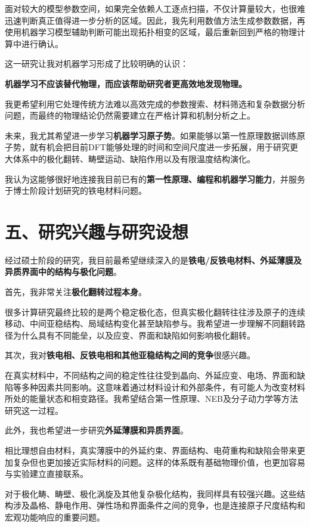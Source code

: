 面对较大的模型参数空间，如果完全依赖人工逐点扫描，不仅计算量较大，也很难迅速判断真正值得进一步分析的区域。因此，我先利用数值方法生成参数数据，再使用机器学习模型辅助判断可能出现拓扑相变的区域，最后重新回到严格的物理计算中进行确认。

这一研究让我对机器学习形成了比较明确的认识：

\textbf{机器学习不应该替代物理，而应该帮助研究者更高效地发现物理。}

我更希望利用它处理传统方法难以高效完成的参数搜索、材料筛选和复杂数据分析问题，而最终的物理结论仍然需要建立在严格计算和机制分析之上。

未来，我尤其希望进一步学习\textbf{机器学习原子势}。如果能够以第一性原理数据训练原子势，就有机会把目前DFT能够处理的时间和空间尺度进一步拓展，用于研究更大体系中的极化翻转、畴壁运动、缺陷作用以及有限温度结构演化。

我认为这能够很好地连接我目前已有的\textbf{第一性原理、编程和机器学习能力}，并服务于博士阶段计划研究的铁电材料问题。

\section{五、研究兴趣与研究设想}

经过硕士阶段的研究，我目前最希望继续深入的是\textbf{铁电/反铁电材料、外延薄膜及异质界面中的结构与极化问题}。

首先，我非常关注\textbf{极化翻转过程本身}。

很多计算研究最终比较的是两个稳定极化态，但真实极化翻转往往涉及原子的连续移动、中间亚稳结构、局域结构变化甚至缺陷参与。我希望进一步理解不同翻转路径为什么具有不同能垒，以及应变、界面和缺陷如何影响极化翻转。

其次，我对\textbf{铁电相、反铁电相和其他亚稳结构之间的竞争}很感兴趣。

在真实材料中，不同结构之间的稳定性往往受到晶向、外延应变、电场、界面和缺陷等多种因素共同影响。这意味着通过材料设计和外部条件，有可能人为改变材料所处的能量状态和相变路径。我希望结合第一性原理、NEB及分子动力学等方法研究这一过程。

此外，我也希望进一步研究\textbf{外延薄膜和异质界面}。

相比理想自由材料，真实薄膜中的外延约束、界面结构、电荷重构和缺陷会带来更加复杂但也更加接近实际材料的问题。这样的体系既有基础物理价值，也更加容易与实验建立直接联系。

对于极化畴、畴壁、极化涡旋及其他复杂极化结构，我同样具有较强兴趣。这些结构涉及晶格、静电作用、弹性场和界面条件之间的竞争，也是连接原子尺度结构和宏观功能响应的重要问题。

